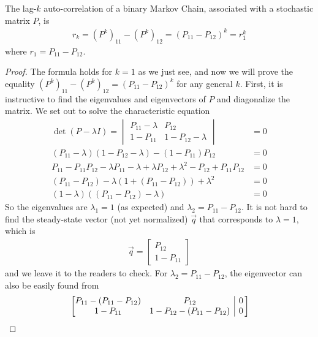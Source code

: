 \begin{proper}
The lag-$k$ auto-correlation of a binary Markov Chain, associated with a stochastic matrix $P$, is
\begin{align}
r_k = (P^k)_{11} - (P^k)_{12} = (P_{11} - P_{12})^k = r_1^k
\end{align}
where $r_1 = P_{11} - P_{12}$.
\end{proper}
\begin{proof}
The formula holds for $k=1$ as we just see, and now we will prove the equality $(P^k)_{11} - (P^k)_{12} = (P_{11} - P_{12})^k$ for any general $k$. First, it is instructive to find the eigenvalues and eigenvectors of $P$ and diagonalize the matrix. We set out to solve the characteristic equation
\begin{align}
\det(P - \lambda I) =
\begin{vmatrix}
P_{11} - \lambda & P_{12} \\
1 - P_{11} & 1 - P_{12} - \lambda
\end{vmatrix} &= 0 \nonumber \\
(P_{11} - \lambda)(1 - P_{12} - \lambda) - (1 - P_{11})P_{12} &= 0 \nonumber \\
P_{11} - P_{11}P_{12} - \lambda P_{11} - \lambda + \lambda P_{12} + \lambda^2 - P_{12} + P_{11}P_{12} &= 0 \nonumber \\ 
(P_{11} - P_{12}) - \lambda (1 + (P_{11} - P_{12})) + \lambda^2 &= 0 \nonumber\\ 
(1-\lambda)((P_{11} - P_{12})-\lambda)&= 0
\end{align}
So the eigenvalues are $\lambda_1 = 1$ (as expected) and $\lambda_2 = P_{11} - P_{12}$. It is not hard to find the steady-state vector (not yet normalized) $\vec{q}$ that corresponds to $\lambda = 1$, which is
\begin{align}
\vec{q} = 
\begin{bmatrix}
P_{12} \\
1 - P_{11} 
\end{bmatrix}
\end{align}
and we leave it to the readers to check. For $\lambda_2 = P_{11} - P_{12}$, the eigenvector can also be easily found from 
\begin{align*}
& \left[\begin{array}{@{}cc|c@{\,}}
P_{11} - (P_{11} - P_{12}) & P_{12} & 0 \\
1 - P_{11} & 1 - P_{12} - (P_{11} - P_{12}) & 0 \\
\end{array}\right]  \\

\end{align*}
\end{proof}
